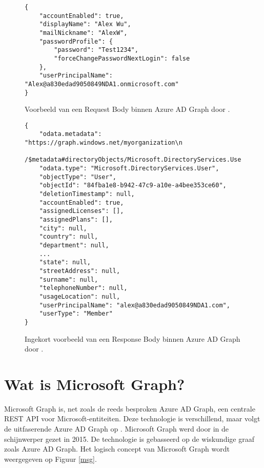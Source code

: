 \begin{figure}[h!]
    \scriptsize
    \begin{verbatim}
{
    "accountEnabled": true,
    "displayName": "Alex Wu",
    "mailNickname": "AlexW",
    "passwordProfile": {
        "password": "Test1234",
        "forceChangePasswordNextLogin": false
    },
    "userPrincipalName": "Alex@a830edad9050849NDA1.onmicrosoft.com"
}
    \end{verbatim}
    \caption[Voorbeeld Request Body Azure AD Graph]{Voorbeeld van een Request Body binnen Azure \ac{AD} Graph door \textcite{Microsoft2015}.}
    \label{hreqb}
\end{figure}

\begin{figure}[h!]
    \scriptsize
    \begin{verbatim}
{
    "odata.metadata": "https://graph.windows.net/myorganization\n
    /$metadata#directoryObjects/Microsoft.DirectoryServices.User/@Element",
    "odata.type": "Microsoft.DirectoryServices.User",
    "objectType": "User",
    "objectId": "84fba1e8-b942-47c9-a10e-a4bee353ce60",
    "deletionTimestamp": null,
    "accountEnabled": true,
    "assignedLicenses": [],
    "assignedPlans": [],
    "city": null,
    "country": null,
    "department": null,
    ...
    "state": null,
    "streetAddress": null,
    "surname": null,
    "telephoneNumber": null,
    "usageLocation": null,
    "userPrincipalName": "alex@a830edad9050849NDA1.com",
    "userType": "Member"
}
    \end{verbatim}
    \caption[Voorbeeld Response Body Azure AD Graph]{Ingekort voorbeeld van een Response Body binnen Azure \ac{AD} Graph door \textcite{Microsoft2015}.}
    \label{hresb}
\end{figure}


\section{Wat is Microsoft Graph?}

Microsoft Graph is, net zoals de reeds besproken Azure \Ac{AD} Graph, een centrale \ac{REST} \ac{API} voor Microsoft-entiteiten. Deze technologie is verschillend, maar volgt de uitfaserende Azure \ac{AD} Graph op \autocite{Microsoft2023n}. Microsoft Graph werd door \textcite{Microsoft2015a} in de schijnwerper gezet in 2015. De technologie is gebasseerd op de wiskundige graaf zoals Azure \Ac{AD} Graph. Het logisch concept van Microsoft Graph wordt weergegeven op Figuur \ref{msg}. \\

